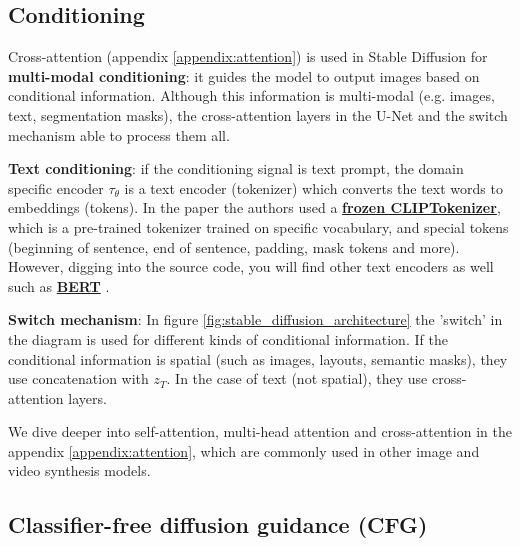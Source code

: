 \subsection{Conditioning}

Cross-attention (appendix \ref{appendix:attention}) is used in Stable Diffusion for \textbf{multi-modal conditioning}: it guides the model to output images based on conditional information. Although this information is multi-modal (e.g. images, text, segmentation masks), the cross-attention layers in the U-Net and the switch mechanism able to process them all.

\textbf{Text conditioning}: if the conditioning signal is text prompt, the domain specific encoder $\tau_\theta$ is a text encoder (tokenizer) which converts the text words to embeddings (tokens). In the paper \cite{stable_diffusion} the authors used a \href{https://github.com/CompVis/latent-diffusion/blob/a506df5756472e2ebaf9078affdde2c4f1502cd4/ldm/modules/encoders/modules.py#L138}{\textbf{frozen CLIPTokenizer}}, which is a pre-trained tokenizer trained on specific vocabulary, and special tokens (beginning of sentence, end of sentence, padding, mask tokens and more). However, digging into the source code, you will find other text encoders as well such as \href{https://github.com/CompVis/latent-diffusion/blame/a506df5756472e2ebaf9078affdde2c4f1502cd4/ldm/modules/encoders/modules.py#L53}{\textbf{BERT}} \cite{bert}.

\textbf{Switch mechanism}: In figure \ref{fig:stable_diffusion_architecture} the 'switch' in the diagram is used for different kinds of conditional information. If the conditional information is spatial (such as images, layouts, semantic masks), they use concatenation with $z_T$. In the case of text (not spatial), they use cross-attention layers. 

We dive deeper into self-attention, multi-head attention and cross-attention in the appendix \ref{appendix:attention}, which are commonly used in other image and video synthesis models.













\subsection{Classifier-free diffusion guidance (CFG)}

